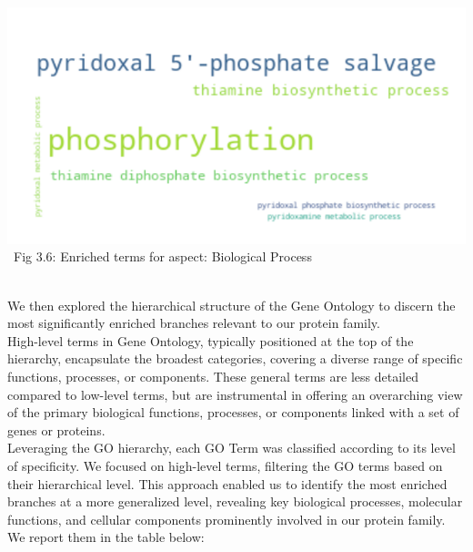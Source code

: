 \documentclass[10pt,twocolumn,letterpaper]{article}
\begin{document}
\begin{center}
    \includegraphics[scale=0.30]{report/img/word_cloud_bp.png} \\
    \
    \small{Fig 3.6: Enriched terms for aspect: Biological Process}
\end{center} \\

We then explored the hierarchical structure of the Gene Ontology to discern the most significantly enriched branches relevant to our protein family. \\

High-level terms in Gene Ontology, typically positioned at the top of the hierarchy, encapsulate the broadest categories, covering a diverse range of specific functions, processes, or components. These general terms are less detailed compared to low-level terms, but are instrumental in offering an overarching view of the primary biological functions, processes, or components linked with a set of genes or proteins. \\

Leveraging the GO hierarchy, each GO Term was classified according to its level of specificity. We focused on high-level terms, filtering the GO terms based on their hierarchical level. This approach enabled us to identify the most enriched branches at a more generalized level, revealing key biological processes, molecular functions, and cellular components prominently involved in our protein family. We report them in the table below:
\end{document}
